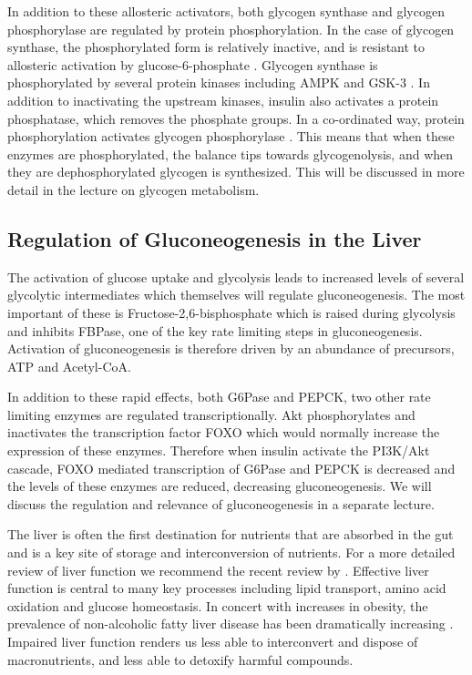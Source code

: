 \documentclass{tufte-handout}
\begin{document}
In addition to these allosteric activators, both glycogen synthase and glycogen phosphorylase are regulated by protein phosphorylation.  In the case of glycogen synthase, the phosphorylated form is relatively inactive, and is resistant to allosteric activation by glucose-6-phosphate \cite{Friedman1963}.  Glycogen synthase is phosphorylated by several protein kinases including AMPK and GSK-3 \cite{Parker1982}.  In addition to inactivating the upstream kinases, insulin also activates a protein phosphatase, which removes the phosphate groups.  In a co-ordinated way, protein phosphorylation activates glycogen phosphorylase \cite{Krebs1964}.  This means that when these enzymes are phosphorylated, the balance tips towards glycogenolysis, and when they are dephosphorylated glycogen is synthesized.  This will be discussed in more detail in the lecture on glycogen metabolism.

\subsection{Regulation of Gluconeogenesis in the Liver}

The activation of glucose uptake and glycolysis leads to increased levels of several glycolytic intermediates which themselves will regulate gluconeogenesis.  The most important of these is Fructose-2,6-bisphosphate which is raised during glycolysis and inhibits FBPase, one of the key rate limiting steps in gluconeogenesis.  Activation of gluconeogenesis is therefore driven by an abundance of precursors, ATP and Acetyl-CoA.

In addition to these rapid effects, both G6Pase and PEPCK, two other rate limiting enzymes are regulated transcriptionally.  Akt phosphorylates and inactivates the transcription factor FOXO which would normally increase the expression of these enzymes.  Therefore when insulin activate the PI3K/Akt cascade, FOXO mediated transcription of G6Pase and PEPCK is decreased and the levels of these enzymes are reduced, decreasing gluconeogenesis.  We will discuss the regulation and relevance of gluconeogenesis in a separate lecture.

  The liver is often the first destination for nutrients that are absorbed in the gut and is a key site of storage and interconversion of nutrients.  For a more detailed review of liver function we recommend the recent review by \citet{Trefts2017}.  Effective liver function is central to many key processes including lipid transport, amino acid oxidation and glucose homeostasis.  In concert with increases in obesity, the prevalence of non-alcoholic fatty liver disease has been dramatically increasing \citep{Hashimoto2011}.  Impaired liver function renders us less able to interconvert and dispose of macronutrients, and less able to detoxify harmful compounds.
\end{document}
